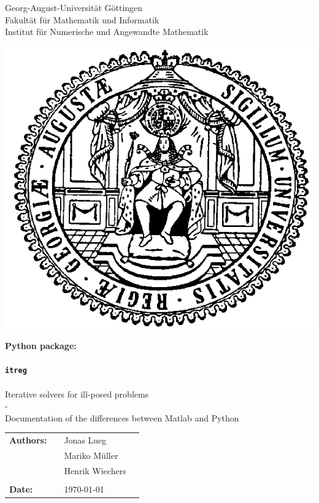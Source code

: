 \documentclass[12pt]{scrartcl}
\begin{document}
\thispagestyle{empty}
\begin{center}
\Large{Georg-August-Universität Göttingen}\\
\Large{Fakultät für Mathematik und Informatik}\\
\Large{Institut für Numerische und Angewandte Mathematik}
\end{center}
\vspace*{1.5cm}
\begin{center}
\includegraphics[scale=0.5]{siegel.png}
\end{center}
\vspace*{1.5cm}
\begin{center}
\textbf{Python package:}\\
~\\
\textbf{\texttt{\Huge{itreg}}}\\
~\\
Iterative solvers for ill-posed problems\\
-\\
Documentation of the differences between Matlab and Python\\
\end{center}
\vspace*{2.5cm}
\begin{flushleft}
\begin{tabular}{llll}
\textbf{Authors:} & & Jonas Lueg&\\
& & Mariko Müller & \\
& & Henrik Wiechers & \\
& & \\
\textbf{Date:} & & \today &\\
\end{tabular}
\end{flushleft}
\end{document}
